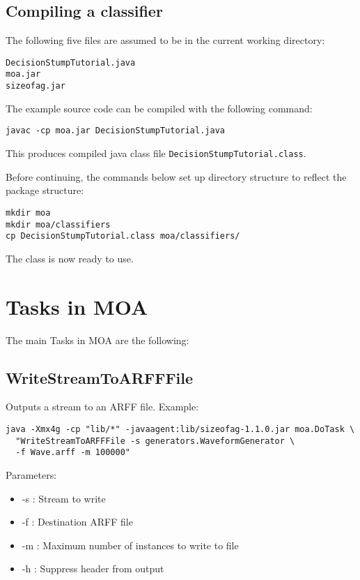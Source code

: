 \documentclass[a4paper,12pt,twoside]{book}
\begin{document}
\section{Compiling a classifier}

The following five files are assumed to be in the current working directory:

\begin{verbatim}
DecisionStumpTutorial.java
moa.jar
sizeofag.jar
\end{verbatim}

The example source code can be compiled with the following command:

\begin{verbatim}
javac -cp moa.jar DecisionStumpTutorial.java
\end{verbatim}

This produces compiled java class file \verb+DecisionStumpTutorial.class+.

Before continuing, the commands below set up directory structure to reflect the package structure:

\begin{verbatim}
mkdir moa
mkdir moa/classifiers
cp DecisionStumpTutorial.class moa/classifiers/
\end{verbatim}

The class is now ready to use.



\chapter{Tasks in MOA}

The main Tasks in MOA are the following:



\section{WriteStreamToARFFFile} 

Outputs a stream to an ARFF file. 
Example:
\begin{footnotesize}\begin{verbatim}
java -Xmx4g -cp "lib/*" -javaagent:lib/sizeofag-1.1.0.jar moa.DoTask \
  "WriteStreamToARFFFile -s generators.WaveformGenerator \
  -f Wave.arff -m 100000" 
\end{verbatim}\end{footnotesize}

Parameters:
\begin{itemize}
\item -s : Stream to write
\item -f : Destination ARFF file
\item -m : Maximum number of instances to write to file
\item -h : Suppress header from output\end{itemize}
\end{document}
